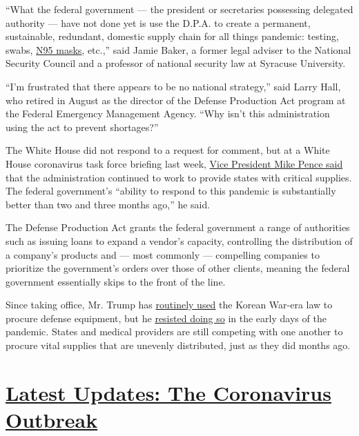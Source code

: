 ``What the federal government --- the president or secretaries
possessing delegated authority --- have not done yet is use the D.P.A.
to create a permanent, sustainable, redundant, domestic supply chain for
all things pandemic: testing, swabs,
\href{https://www.nytimes.com/2020/06/01/health/masks-surgical-N95-coronavirus.html}{N95
masks}, etc.,'' said Jamie Baker, a former legal adviser to the National
Security Council and a professor of national security law at Syracuse
University.

``I'm frustrated that there appears to be no national strategy,'' said
Larry Hall, who retired in August as the director of the Defense
Production Act program at the Federal Emergency Management Agency. ``Why
isn't this administration using the act to prevent shortages?''

The White House did not respond to a request for comment, but at a White
House coronavirus task force briefing last week,
\href{https://www.whitehouse.gov/briefings-statements/press-briefing-vice-president-pence-members-white-house-coronavirus-task-force-baton-rouge-la/}{Vice
President Mike Pence said} that the administration continued to work to
provide states with critical supplies. The federal government's
``ability to respond to this pandemic is substantially better than two
and three months ago,'' he said.

The Defense Production Act grants the federal government a range of
authorities such as issuing loans to expand a vendor's capacity,
controlling the distribution of a company's products and --- most
commonly --- compelling companies to prioritize the government's orders
over those of other clients, meaning the federal government essentially
skips to the front of the line.

Since taking office, Mr. Trump has
\href{https://www.nytimes.com/2020/03/31/us/politics/coronavirus-defense-production-act.html}{routinely
used} the Korean War-era law to procure defense equipment, but he
\href{https://www.nytimes.com/2020/03/20/us/politics/trump-coronavirus-supplies.html}{resisted
doing so} in the early days of the pandemic. States and medical
providers are still competing with one another to procure vital supplies
that are unevenly distributed, just as they did months ago.

\hypertarget{latest-updates-the-coronavirus-outbreak}{%
\section{\texorpdfstring{\href{https://www.nytimes.com/2020/08/07/world/covid-19-news.html?action=click\&pgtype=Article\&state=default\&region=MAIN_CONTENT_1\&context=storylines_live_updates}{Latest
Updates: The Coronavirus
Outbreak}}{Latest Updates: The Coronavirus Outbreak}}\label{latest-updates-the-coronavirus-outbreak}}

